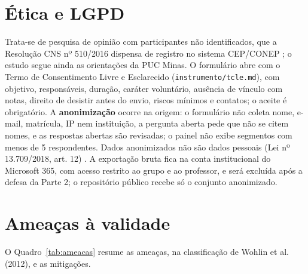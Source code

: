 \documentclass[12pt,a4paper]{article}
\begin{document}
\section{Ética e LGPD}

Trata-se de pesquisa de opinião com participantes não identificados, que a Resolução CNS nº 510/2016 dispensa de registro no sistema CEP/CONEP \citep{cns510}; o estudo segue ainda as orientações da PUC Minas. O formulário abre com o Termo de Consentimento Livre e Esclarecido (\texttt{instrumento/tcle.md}), com objetivo, responsáveis, duração, caráter voluntário, ausência de vínculo com notas, direito de desistir antes do envio, riscos mínimos e contatos; o aceite é obrigatório. A \textbf{anonimização} ocorre na origem: o formulário não coleta nome, e-mail, matrícula, IP nem instituição, a pergunta aberta pede que não se citem nomes, e as respostas abertas são revisadas; o painel não exibe segmentos com menos de 5 respondentes. Dados anonimizados não são dados pessoais (Lei nº 13.709/2018, art. 12) \citep{lgpd}. A exportação bruta fica na conta institucional do Microsoft 365, com acesso restrito ao grupo e ao professor, e será excluída após a defesa da Parte 2; o repositório público recebe só o conjunto anonimizado.

\section{Ameaças à validade}

O Quadro~\ref{tab:ameacas} resume as ameaças, na classificação de Wohlin et al. (2012), e as mitigações.
\end{document}

